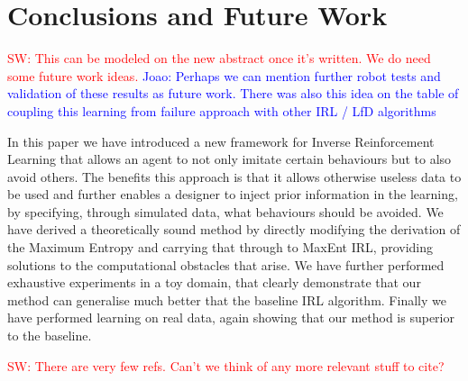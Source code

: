 \documentclass[letterpaper]{article}
\newcommand{\sw}[1]{\textcolor{red}{SW: #1}}
\newcommand{\jm}[1]{\textcolor{blue}{Joao: #1}}
\newcommand{\sw}[1]{}
\newcommand{\jm}[1]{}
\begin{document}
\section{Conclusions and Future Work}

\sw{This can be modeled on the new abstract once it's written.  We do need some future work ideas.} \jm{Perhaps we can mention further robot tests and validation of these results as future work. There was also this idea on the table of coupling this learning from failure approach with other IRL / LfD algorithms}

In this paper we have introduced a new framework for Inverse Reinforcement Learning that allows an agent to not only imitate certain behaviours but to also avoid others. The benefits this approach is that it allows otherwise useless data to be used and further enables a designer to inject prior information in the learning, by specifying, through simulated data, what behaviours should be avoided. We have derived a theoretically sound method by directly modifying the derivation of the Maximum Entropy and carrying that through to MaxEnt IRL, providing solutions to the computational obstacles that arise. We have further performed exhaustive experiments in a toy domain, that clearly demonstrate that our method can generalise much better that the baseline IRL algorithm. Finally we have performed learning on real data, again showing that our method is superior to the baseline.  

\sw{There are very few refs.  Can't we think of any more relevant stuff to cite?}



	
\end{document}
